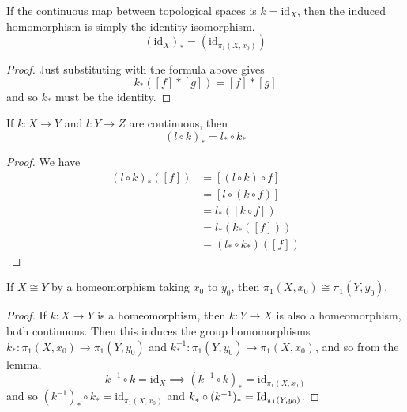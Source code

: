   \begin{lemma}
    If the continuous map between topological spaces is $k = \mathrm{id}_X$, then the induced homomorphism is simply the identity isomorphism. 
    \begin{equation}
      (\mathrm{id}_X)_\ast = (\mathrm{id}_{\pi_1 (X, x_0)}) 
    \end{equation}
  \end{lemma}
  \begin{proof}
    Just substituting with the formula above gives 
    \begin{equation}
      k_\ast ([f] \ast [g]) = [f] \ast [g] 
    \end{equation}
    and so $k_\ast$ must be the identity. 
  \end{proof}

  \begin{theorem}
    If $k: X \to Y$ and $l: Y \to Z$ are continuous, then 
    \begin{equation}
      (l \circ k)_\ast = l_\ast \circ k_\ast
    \end{equation}
  \end{theorem}
  \begin{proof}
    We have 
    \begin{align}
      (l \circ k)_\ast ([f]) & = [(l \circ k) \circ f ] \\ 
                             & = [l \circ  (k \circ f)] \\ 
                             & = l_\ast ([k \circ f]) \\ 
                             & = l_\ast (k_\ast ([f])) \\ 
                             & = (l_\ast \circ k_\ast) ([f]) 
    \end{align}
  \end{proof}

  \begin{corollary}
    If $X \cong Y$ by a homeomorphism taking $x_0$ to $y_0$, then $\pi_1 (X, x_0) \cong \pi_1 (Y, y_0)$. 
  \end{corollary}
  \begin{proof}
    If $k: X \to Y$ is a homeomorphism, then $k: Y \to X$ is also a homeomorphism, both continuous. Then this induces the group homomorphisms $k_\ast: \pi_1 (X, x_0) \to \pi_1 (Y, y_0)$ and $k^{-1}_\ast: \pi_1 (Y, y_0) \to \pi_1 (X, x_0)$, and so from the lemma, 
    \begin{equation}
      k^{-1} \circ k = \mathrm{id}_X \implies (k^{-1} \circ k)_\ast = \mathrm{id}_{\pi_1 (X, x_0)}
    \end{equation}
    and so $(k^{-1})_\ast \circ k_\ast = \mathrm{id}_{\pi_1 (X, x_0)}$ and $k_\ast \circ (k^{-1})_\ast = \operatorname{Id}_{\pi_1 (Y, y_0)}$. 
  \end{proof}

